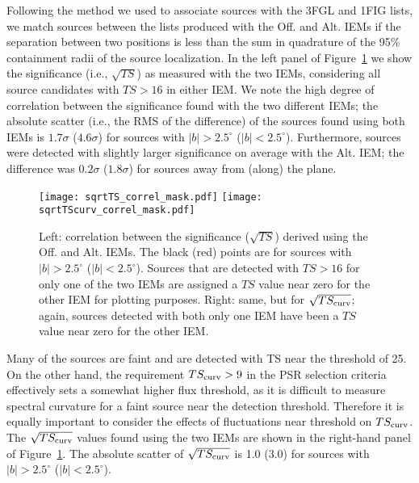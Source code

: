 \documentclass[iop]{emulateapj}
\begin{document}
Following the method we used to associate sources with the 
  3FGL and 1FIG lists, we match sources between the lists produced with
  the Off. and Alt. IEMs if the separation between two positions is
  less than the sum in quadrature of the 95\% containment radii of the
  source localization.  In the left panel of Figure~\ref{fig:ts_correl} we show the significance (i.e.,
  $\sqrt{TS}$) as measured with the two IEMs,
  considering all source candidates with $TS > 16$ in either IEM.  We
  note the high degree of correlation between the significance
  found with the two different IEMs; the absolute scatter (i.e., the
  RMS of the difference) of the sources found using both IEMs 
  is $1.7\sigma$ ($4.6\sigma$)  for sources with $|b| > 2.5^\circ$
  ($|b| < 2.5^\circ$).   Furthermore, sources were detected with
  slightly larger significance on average with the Alt. IEM; the
  difference was $0.2\sigma$ ($1.8\sigma$)  for sources away from
  (along) the plane.

\begin{figure*}[!ht]
  \centering
\texttt{[image: sqrtTS\_correl\_mask.pdf]}
\texttt{[image: sqrtTScurv\_correl\_mask.pdf]}
\caption{Left: correlation between the significance ($\sqrt{TS}$)
  derived using the Off. and Alt. IEMs. The black (red) points are for
  sources with $|b| > 2.5^\circ$ ($|b| < 2.5^\circ$).  Sources that
  are detected with $TS > 16$ for only one of the two IEMs are
  assigned a $TS$ value near zero for the other IEM for plotting
  purposes.  Right: same, but for $\sqrt{TS_{\rm curv}}$; again,
  sources detected with both only one IEM have been a $TS$ value near
  zero for the other IEM.}  
\label{fig:ts_correl} 
\end{figure*}

Many of the sources are faint and are detected with TS near
  the threshold of 25.  On the other hand, the requirement $TS_{\rm
    curv} > 9$ in the PSR selection criteria effectively sets a
  somewhat higher flux threshold, as it is difficult to measure
  spectral curvature for a faint source near the detection threshold.
  Therefore it is equally important to consider the effects of
  fluctuations near threshold on $TS_{\rm curv}$.  The
  $\sqrt{TS_{\rm curv}}$ values found using the two IEMs are
  shown in the right-hand panel of Figure~\ref{fig:ts_correl}.  The
  absolute scatter of $\sqrt{TS_{\rm curv}}$ is 1.0 (3.0) for
  sources with $|b| > 2.5^\circ$ ($|b| < 2.5^\circ$).
\end{document}
